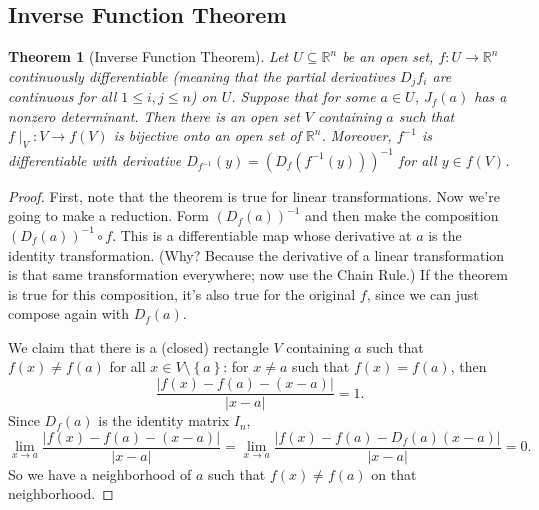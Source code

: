 \documentclass[12pt]{article}
\newcommand{\real}{\mathbb{R}}
\newcommand\inv[1]{#1^{-1}}
\newcommand\setb[1]{\left \{ #1 \right \}}
\newcommand{\paren}[1]{\left( #1 \right)}
\newtheorem{theorem}{Theorem}[section]
\theoremstyle{definition}
\theoremstyle{remark}
\begin{document}
\subsection{Inverse Function Theorem}
\begin{theorem}[Inverse Function Theorem]
    Let $U \subseteq \real^n$ be an open set, $f : U \to \real^n$ continuously differentiable (meaning that the partial derivatives $D_jf_i$ are continuous for all $1 \leq i , j \leq n$) on $U$. Suppose that for some $a \in U$, $J_f(a)$ has a nonzero determinant. Then there is an open set $V$ containing $a$ such that $f \mid_V : V \to f(V)$ is bijective onto an open set of $\real^n$. Moreover, $\inv{f}$ is differentiable with derivative $D_{\inv{f}}(y) = \inv{ \paren{ D_f \paren{ \inv{f}(y) } } }$ for all $y \in f(V)$.
\end{theorem}
\begin{proof}
    First, note that the theorem is true for linear transformations. Now we're going to make a reduction. Form $\inv{ \paren{ D_f(a) } }$ and then make the composition $\inv{ \paren{ D_f(a) } } \circ f$. This is a differentiable map whose derivative at $a$ is the identity transformation. (Why? Because the derivative of a linear transformation is that same transformation everywhere; now use the Chain Rule.) If the theorem is true for this composition, it's also true for the original $f$, since we can just compose again with $D_f(a)$.
    
    We claim that there is a (closed) rectangle $V$ containing $a$ such that $f(x) \neq f(a)$ for all $x \in V \setminus \setb{ a }$: for $x \neq a$ such that $f(x) = f(a)$, then 
    \[
        \frac{ | f(x) - f(a) - (x - a) | }{|x - a|} = 1.
    \]
    Since $D_f(a)$ is the identity matrix $I_n$,
    \[
        \lim\limits_{x \to a} \frac{ | f(x) - f(a) - (x - a) | }{|x - a|}  = \lim\limits_{x \to a} \frac{ | f(x) - f(a) - D_f(a)(x - a) | }{|x - a|}  = 0.
    \]
    So we have a neighborhood of $a$ such that $f(x) \neq f(a)$ on that neighborhood. 
    

\end{proof}
\end{document}
